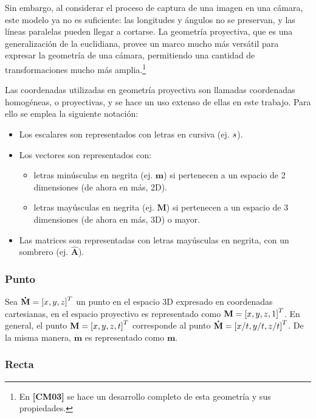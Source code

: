 \documentclass[11pt,a4paper,titlepage]{article}
\newcommand{\Cite}[1]{\textbf{[#1]}}
\newcommand{\Scalar}[1]{\ensuremath{\mathnormal{#1}}}
\newcommand{\Two}[1]{\ensuremath{\mathbf{#1}}}
\newcommand{\Three}[1]{\ensuremath{\mathbf{#1}}}
\newcommand{\Mat}[1]{\ensuremath{\mathbf{\hat{#1}}}}
\newcommand{\TwoCart}[1]{\ensuremath{\mathbf{\dot{#1}}}}
\newcommand{\ThreeCart}[1]{\ensuremath{\mathbf{\dot{#1}}}}
\newcommand{\Vector}[1]{\ensuremath{\left[#1\right]^T}}
\begin{document}
Sin embargo, al considerar el proceso de captura de una imagen en una cámara, este modelo ya no es suficiente: las longitudes y ángulos no se preservan, y las líneas paralelas pueden llegar a cortarse. La geometría proyectiva, que es una generalización de la euclidiana, provee un marco mucho más versátil para expresar la geometría de una cámara, permitiendo una cantidad de transformaciones mucho más amplia.\footnote{En \Cite{CM03} se hace un desarrollo completo de esta geometría y sus propiedades.}

Las coordenadas utilizadas en geometría proyectiva son llamadas coordenadas homogéneas, o proyectivas, y se hace un uso extenso de ellas en este trabajo. Para ello se emplea la siguiente notación:

\begin{itemize}
	\item Los escalares son representados con letras en cursiva (ej. \Scalar{s}).
	\item Los vectores son representados con:
	\begin{itemize}
		\item letras minúsculas en negrita (ej. \Two{m}) si pertenecen a un espacio de 2 dimensiones (de ahora en más, 2D).
		\item letras mayúsculas en negrita (ej. \Three{M}) si pertenecen a un espacio de 3 dimensiones (de ahora en más, 3D) o mayor.
	\end{itemize}
	\item Las matrices son representadas con letras mayúsculas en negrita, con un sombrero (ej. \Mat{A}).
\end{itemize}

\subsubsection{Punto}

Sea $\ThreeCart{M} = \Vector{\Scalar{x}, \Scalar{y}, \Scalar{z}}$ un punto en el espacio 3D expresado en coordenadas cartesianas, en el espacio proyectivo es representado como $\Three{M} = \Vector{\Scalar{x}, \Scalar{y}, \Scalar{z}, 1}$. En general, el punto $\Three{M} = \Vector{\Scalar{x}, \Scalar{y}, \Scalar{z}, \Scalar{t}}$ corresponde al punto $\ThreeCart{M} = \Vector{\Scalar{x}/\Scalar{t}, \Scalar{y}/\Scalar{t}, \Scalar{z}/\Scalar{t}}$. De la misma manera, \TwoCart{m} es representado como \Two{m}.

\subsubsection{Recta}
\end{document}

